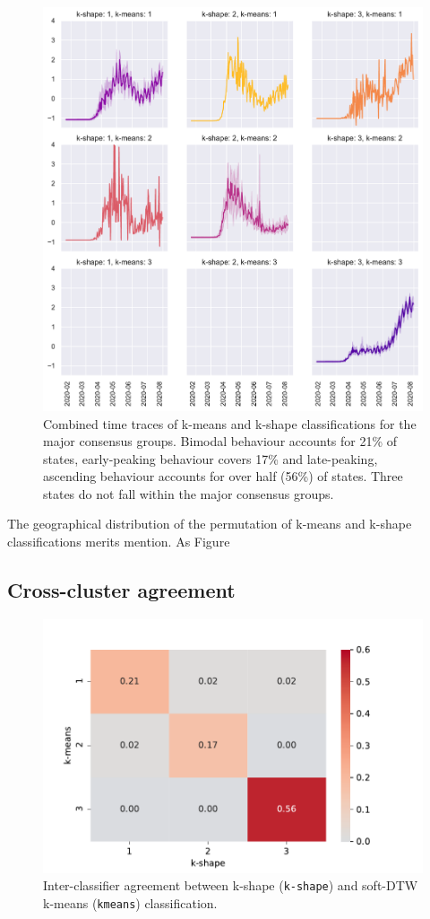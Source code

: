 \documentclass{article}
\begin{document}
\begin{figure}
	\includegraphics[width=0.8\linewidth]{figures/k-combinations}
	\centering
	\caption{Combined time traces of k-means and k-shape classifications for the major consensus groups. Bimodal behaviour accounts for 21\% of states, early-peaking behaviour covers 17\% and late-peaking, ascending behaviour accounts for over half (56\%) of states. Three states do not fall within the major consensus groups.}
	\label{fig:k_combinations}
\end{figure}

The geographical distribution of the permutation of k-means and k-shape classifications merits mention. As Figure 


\subsection{Cross-cluster agreement} %
\label{sub:cross_cluster_agreement}

\begin{figure}
	\includegraphics[width=0.5\linewidth]{figures/inter-classifier}
	\centering
	\caption{Inter-classifier agreement between k-shape (\texttt{k-shape}) and soft-DTW k-means (\texttt{kmeans}) classification.}
	\label{fig:inter_classifier}
\end{figure}
\end{document}
